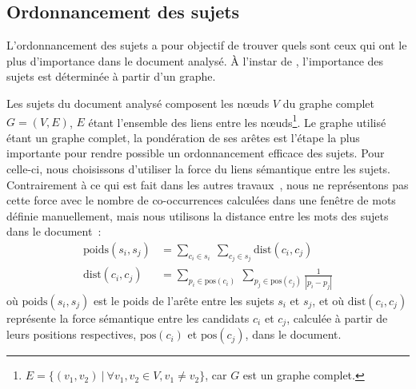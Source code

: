   \subsection{Ordonnancement des sujets}
  \label{subsec:ordonnancement_des_sujets}
    L'ordonnancement des sujets a pour objectif de trouver quels sont ceux qui
    ont le plus d'importance dans le document analysé. À l'instar de
    , l'importance des sujets est déterminée à
    partir d'un graphe.

    Les sujets du document analysé composent les n\oe{}uds $V$ du graphe complet
    $G = (V, E)$, $E$ étant l'ensemble des liens entre les
    n\oe{}uds\footnote{$E = \{(v_1, v_2)\ |\ \forall{v_1, v_2 \in V}, v_1 \neq v_2\}$,
    car $G$ est un graphe complet.}. Le graphe utilisé étant un graphe complet,
    la pondération de ses arêtes est l'étape la plus importante pour rendre
    possible un ordonnancement efficace des sujets. Pour celle-ci, nous 
    choisissons d'utiliser la force du liens sémantique entre les sujets.
    Contrairement à ce qui est fait dans les autres
    travaux~\cite{wan2008expandrank,tsatsaronis2010semanticrank,liu2010topicalpagerank},
    nous ne représentons pas cette force avec le nombre de co-occurrences
    calculées dans une fenêtre de mots définie manuellement, mais nous utilisons
    la distance entre les mots des sujets dans le document~:
    \begin{align}
      \text{poids}(s_i, s_j) &= \sum_{c_i \in s_i}\ \sum_{c_j \in s_j} \text{dist}(c_i, c_j) \label{math:ponderation}\\
      \text{dist}(c_i, c_j) &= \sum_{p_i \in \text{pos}(c_i)}\ \sum_{p_j \in \text{pos}(c_j)} \frac{1}{|p_i - p_j|} \label{math:distance}
    \end{align}
    où $\text{poids}(s_i, s_j)$ est le poids de l'arête entre les sujets $s_i$
    et $s_j$, et où $\text{dist}(c_i, c_j)$ représente la force sémantique entre
    les candidats $c_i$ et $c_j$, calculée à partir de leurs positions
    respectives, $\text{pos}(c_i)$ et $\text{pos}(c_j)$, dans le document.

